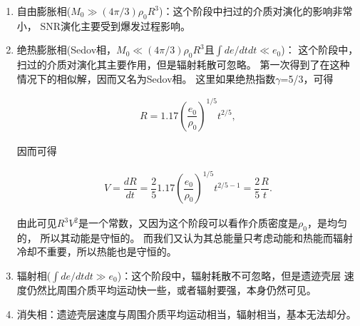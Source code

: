 \begin{enumerate}

    \item 自由膨胀相($M_0\gg(4\pi/3)\rho_0R^3$)：这个阶段中扫过的介质对演化的影响非常小，
    SNR演化主要受到爆发过程影响。

    \item 绝热膨胀相(Sedov相，$M_0\ll(4\pi/3)\rho_0R^3$且$\int de/dt dt\ll e_0$)：
    这个阶段中，扫过的介质对演化其主要作用，但是辐射耗散可忽略。
    \citet{1959sdmm.book.....S}第一次得到了在这种情况下的相似解，因而又名为Sedov相。
    这里如果绝热指数$\gamma$=5/3，可得

    \begin{equation}
      \begin{aligned}
        R = 1.17(\dfrac{e_0}{\rho_0})^{1/5}t^{2/5},
      \end{aligned}
    \end{equation}

    因而可得

    \begin{equation}
      \begin{aligned}
        V = \dfrac{dR}{dt} = \dfrac{2}{5}1.17(\dfrac{e_0}{\rho_0})^{1/5}t^{2/5-1} = \dfrac{2}{5}\dfrac{R}{t}.
      \end{aligned}
    \end{equation}

    由此可见$R^3V^2$是一个常数，又因为这个阶段可以看作介质密度是$\rho_0$，是均匀的，
    所以其动能是守恒的。
    而我们又认为其总能量只考虑动能和热能而辐射冷却不重要，所以热能也是守恒的。

    \item 辐射相($\int de/dt dt\gg e_0$)：这个阶段中，辐射耗散不可忽略，但是遗迹壳层
    速度仍然比周围介质平均运动快一些，或者辐射要强，本身仍然可见。

    \item 消失相：遗迹壳层速度与周围介质平均运动相当，辐射相当，基本无法却分。

\end{enumerate}

